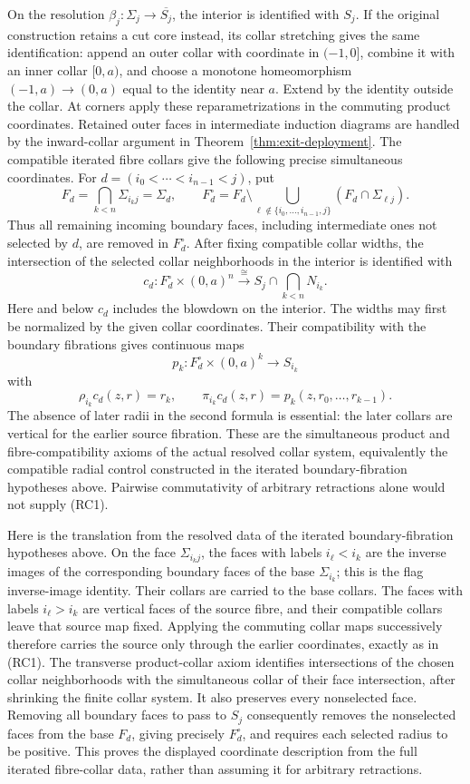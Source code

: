 \documentclass[11pt,a4paper]{article}
\theoremstyle{definition}
\begin{document}
On the resolution \(\beta_j:\Sigma_j\to\overline{S_j}\), the interior is identified with \(S_j\). If the original construction retains a cut core instead, its collar stretching gives the same identification: append an outer collar with coordinate in \((-1,0]\), combine it with an inner collar \([0,a)\), and choose a monotone homeomorphism \((-1,a)\to(0,a)\) equal to the identity near \(a\). Extend by the identity outside the collar. At corners apply these reparametrizations in the commuting product coordinates. Retained outer faces in intermediate induction diagrams are handled by the inward-collar argument in Theorem~\ref{thm:exit-deployment}. The compatible iterated fibre collars give the following precise simultaneous coordinates. For
\(d=(i_0<\cdots<i_{n-1}<j)\), put
\[
 F_d=\bigcap_{k<n}\Sigma_{i_kj}=\Sigma_d,
 \qquad F_d^\circ=F_d\setminus
       \bigcup_{\ell\notin\{i_0,\ldots,i_{n-1},j\}}
                  (F_d\cap\Sigma_{\ell j}).
\]
Thus all remaining incoming boundary faces, including intermediate ones not selected by \(d\), are removed in \(F_d^\circ\). After fixing compatible collar widths, the intersection of the selected collar neighborhoods in the interior is identified with
\[
 c_d:F_d^\circ\times(0,a)^n\xrightarrow{\cong}
           S_j\cap\bigcap_{k<n}N_{i_k}.
\]
Here and below \(c_d\) includes the blowdown on the interior. The widths may first be normalized by the given collar coordinates. Their compatibility with the boundary fibrations gives continuous maps
\[
 p_k:F_d^\circ\times(0,a)^k\longrightarrow S_{i_k}
\]
with
\[
 \rho_{i_k}c_d(z,r)=r_k,
 \qquad
 \pi_{i_k}c_d(z,r)=p_k(z,r_0,\ldots,r_{k-1}).
 \tag{RC1}
\]
The absence of later radii in the second formula is essential: the later collars are vertical for the earlier source fibration. These are the simultaneous product and fibre-compatibility axioms of the actual resolved collar system, equivalently the compatible radial control constructed in the iterated boundary-fibration hypotheses above. Pairwise commutativity of arbitrary retractions alone would not supply (RC1).

Here is the translation from the resolved data of the iterated boundary-fibration hypotheses above. On the face \(\Sigma_{i_kj}\), the faces with labels \(i_\ell<i_k\) are the inverse images of the corresponding boundary faces of the base \(\Sigma_{i_k}\); this is the flag inverse-image identity. Their collars are carried to the base collars. The faces with labels \(i_\ell>i_k\) are vertical faces of the source fibre, and their compatible collars leave that source map fixed. Applying the commuting collar maps successively therefore carries the source only through the earlier coordinates, exactly as in (RC1). The transverse product-collar axiom identifies intersections of the chosen collar neighborhoods with the simultaneous collar of their face intersection, after shrinking the finite collar system. It also preserves every nonselected face. Removing all boundary faces to pass to \(S_j\) consequently removes the nonselected faces from the base \(F_d\), giving precisely \(F_d^\circ\), and requires each selected radius to be positive. This proves the displayed coordinate description from the full iterated fibre-collar data, rather than assuming it for arbitrary retractions.
\end{document}
